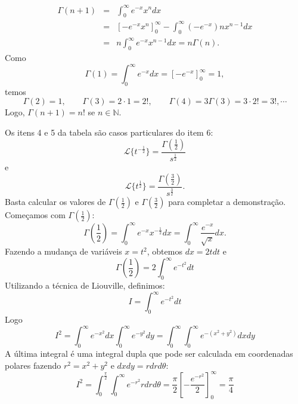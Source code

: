 \begin{eqnarray*}
\Gamma(n+1)&=&\int_0^\infty e^{-x}x^{n}dx\\
&=&\left[-e^{-x}x^{n}\right]_0^\infty-\int_0^\infty (-e^{-x})nx^{n-1}dx\\
&=&n\int_0^\infty e^{-x}x^{n-1}dx=n\Gamma(n).
\end{eqnarray*}
Como 
\begin{equation}
\Gamma(1)=\int_0^\infty e^{-x}dx=\left[-e^{-x}\right]_0^\infty=1,
\end{equation}
temos
\begin{equation}
\Gamma(2)=1,\qquad \Gamma(3)=2\cdot 1=2!,\qquad \Gamma(4)=3\Gamma(3)=3\cdot 2!=3!,\cdots
\end{equation}
Logo, $\Gamma(n+1)=n!$ se $n\in\mathbb{N}$.
\begin{ex} Os itens 4 e 5 da tabela são casos particulares do item 6:
 \begin{equation}
 \mathcal{L}\{t^{-\frac{1}{2}}\}=\frac{\Gamma\left(\frac{1}{2}\right)}{s^{\frac{1}{2}}}
 \end{equation}
e
 \begin{equation}
 \mathcal{L}\{t^{\frac{1}{2}}\}=\frac{\Gamma\left(\frac{3}{2}\right)}{s^{\frac{3}{2}}}.
 \end{equation}
 Basta calcular os valores de $\Gamma\left(\frac{1}{2}\right)$ e $\Gamma\left(\frac{3}{2}\right)$ para completar a demonstração. Começamos com $\Gamma\left(\frac{1}{2}\right)$:
 \begin{equation}
 \Gamma\left(\frac{1}{2}\right)=\int_0^\infty e^{-x}x^{-\frac{1}{2}}dx=\int_0^\infty \frac{e^{-x}}{\sqrt{x}}dx.
 \end{equation}
 Fazendo a mudança de variáveis $x=t^{2}$, obtemos $dx=2tdt$ e
\begin{equation}\Gamma\left(\frac{1}{2}\right)=2\int_{0}^{\infty}e^{-t^2}dt
\end{equation}
Utilizando a técnica de Liouville, definimos:
\begin{equation}
I=\int_{0}^{\infty}e^{-t^2}dt
\end{equation}
Logo
\begin{equation}
I^2=\int_{0}^{\infty}e^{-x^2}dx\int_{0}^{\infty}e^{-y^2}dy=\int_{0}^{\infty}\int_{0}^{\infty}e^{-(x^2+y^2)}dx dy
\end{equation}
A última integral é uma integral dupla que pode ser calculada em coordenadas polares fazendo $r^2=x^2+y^2$ e $dxdy=rdrd\theta$:
\begin{equation}
I^2=\int_{0}^{\frac{\pi}{2}}\int_{0}^{\infty}e^{-r^2}rdr d{\theta}=\frac{\pi}{2}\left[-\frac{e^{-r^2}}{2}\right]_0^\infty=\frac{\pi}{4}

\end{equation}
\end{ex}
